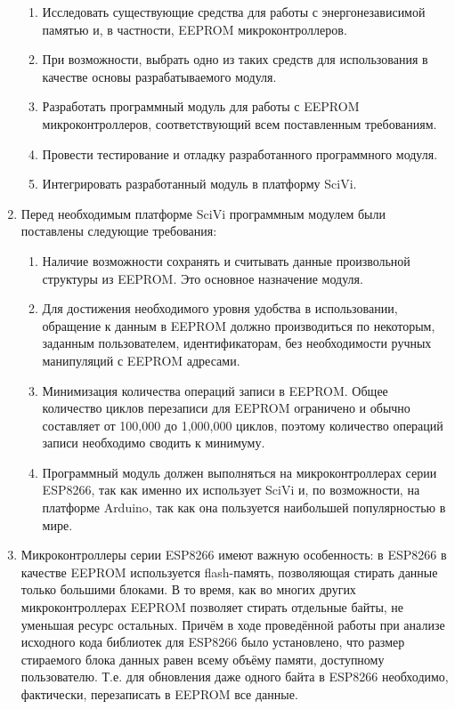 \documentclass[14pt]{extarticle}
\begin{document}
\begin{enumerate}
\begin{enumerate}
		\item Исследовать существующие средства для работы с энергонезависимой памятью и, в частности, EEPROM микроконтроллеров.
		\item При возможности, выбрать одно из таких средств для использования в качестве основы разрабатываемого модуля.
		\item Разработать программный модуль для работы с EEPROM микроконтроллеров, соответствующий всем поставленным требованиям.
		\item Провести тестирование и отладку разработанного программного модуля.
		\item Интегрировать разработанный модуль в платформу SciVi.
	\end{enumerate}
	\item Перед необходимым платформе SciVi программным модулем были поставлены следующие требования:
	\begin{enumerate}
		\item Наличие возможности сохранять и считывать данные произвольной структуры из EEPROM. 
		Это основное назначение модуля.
		\item Для достижения необходимого уровня удобства в использовании, обращение к данным в EEPROM должно производиться по некоторым, заданным пользователем, идентификаторам, без необходимости ручных манипуляций с EEPROM адресами.
		\item Минимизация количества операций записи в EEPROM.
		Общее количество циклов перезаписи для EEPROM ограничено и обычно составляет от 100,000 до 1,000,000 циклов, поэтому количество операций записи необходимо сводить к минимуму.
		\item  Программный модуль должен выполняться на микроконтроллерах серии ESP8266, так как именно их использует SciVi и, по возможности, на платформе Arduino, так как она пользуется наибольшей популярностью в мире.
	\end{enumerate}
	\item Микроконтроллеры серии ESP8266 имеют важную особенность: в ESP8266 в качестве EEPROM используется flash-память, позволяющая стирать данные только большими блоками.
	В то время, как во многих других микроконтроллерах EEPROM позволяет стирать отдельные байты, не уменьшая ресурс остальных.
	Причём в ходе проведённой работы при анализе исходного кода библиотек для ESP8266 было установлено, что размер стираемого блока данных равен всему объёму памяти, доступному пользователю.
	Т.е. для обновления даже одного байта в ESP8266 необходимо, фактически, перезаписать в EEPROM все данные.

\end{enumerate}
\end{document}
